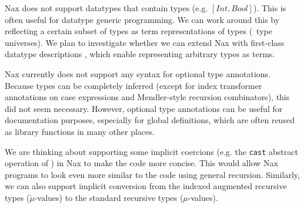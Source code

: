 Nax does not support datatypes that contain types (e.g. $[Int,Bool]$).
This is often useful for datatype generic programming. We can work around
this by reflecting a certain subset of types as term representations of types
(\aka\ type universes). We plan to investigate whether we can extend Nax with
first-class datatype descriptions \cite{DagMcb12}, which enable representing
arbitrary types as terms.

Nax currently does not support any syntax for optional type annotations.
Because types can be completely inferred (except for index transformer
annotations on case expressions and Mendler-style recursion combinators),
this did not seem necessary. However, optional type annotations can be useful
for documentation purposes, especially for global definitions, which are often
reused as library functions in many other places.

We are thinking about supporting some implicit coercions (e.g. the {\tt cast}
abstract operation of \MPr) in Nax to make the code more concise.
This would allow Nax programs to look even more similar to the code
using general recursion. Similarly, we can also support implicit conversion
from the indexed augmented recursive types ($\breve{\mu}$-values) to
the standard recursive types ($\mu$-values).

